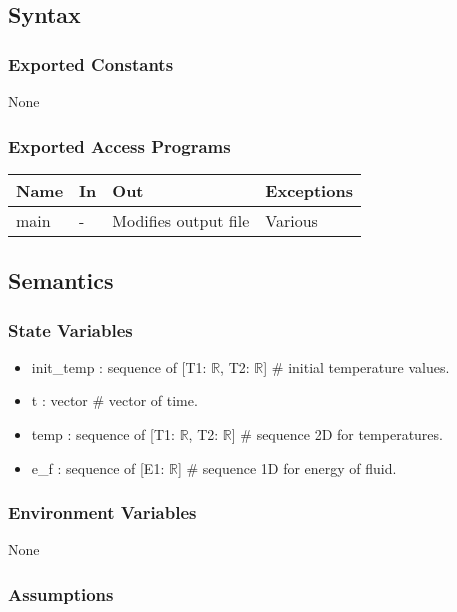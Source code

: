 \documentclass[12pt, titlepage]{article}
\begin{document}
\subsection{Syntax}

\subsubsection{Exported Constants}
None
\subsubsection{Exported Access Programs}

\begin{center}
\begin{tabular}{p{2cm} p{4cm} p{4cm} p{2cm}}
\hline
\textbf{Name} & \textbf{In} & \textbf{Out} & \textbf{Exceptions} \\
\hline
main & - & Modifies output file & Various \\
\hline
\end{tabular}
\end{center}

\subsection{Semantics}

\subsubsection{State Variables}
\begin{itemize}
    \item init\_temp : sequence of [T1: $\mathbb{R}$, T2: $ \mathbb{R}$]            \# initial temperature values.  
    \item t : vector        \# vector of time. 
    \item temp : sequence of [T1: $\mathbb{R}$, T2: $\mathbb{R}$]   \# sequence 2D for temperatures. 
    \item e\_f : sequence of [E1: $ \mathbb{R}$] \# sequence 1D for energy of fluid. 
\end{itemize}

\subsubsection{Environment Variables}

None

\subsubsection{Assumptions}
\end{document}
